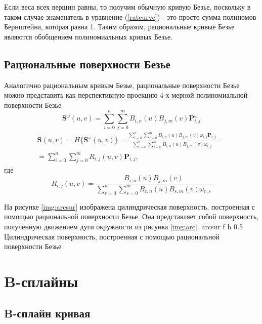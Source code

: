 \documentclass{bmstu}
\begin{document}
Если веса всех вершин равны, то получим обычную кривую Безье, поскольку в таком случае знаменатель в уравнение (\ref{ratcurve}) - это просто сумма полиномов Бернштейна, которая равна 1. Таким образом, рациональные кривые Безье являются обобщением полиномиальных кривых Безье.
\subsection{Рациональные поверхности Безье}

Аналогично рациональным кривым Безье, рациональные поверхности Безье можно представить как перспективную проекцию 4-х мерной полиномиальной поверхности Безье
\[
    \mathbf{S}^\omega(u, v) = \sum\limits_{i=0}^n\sum\limits_{j=0}^mB_{i,n}(u)B_{j,m}(v)\mathbf{P}^\omega_{i,j}
\]
\begin{multline}
    \mathbf{S}(u,v) = H\{\mathbf{S}^\omega(u, v)\} =  \frac{\sum\limits_{i=0}^n\sum\limits_{j=0}^mB_{i,n}(u)B_{j,m}(v)\omega_{i, j}\mathbf{P}_{i,j}}{\sum\limits_{i=0}^n\sum\limits_{j=0}^mB_{i,n}(u)B_{j,m}(v)\omega_{i, j}} =\\= \sum\limits_{i=0}^n\sum\limits_{j=0}^mR_{i,j}(u,v)\mathbf{P}_{i,j},
\end{multline}
где
\begin{equation}
    R_{i,j}(u, v) = \frac{B_{i, n}(u)B_{j, m}(v)}{\sum\limits_{r=0}^n\sum\limits_{s=0}^mB_{r,n}(u)B_{s,m}(v)\omega_{r, s}}
\end{equation}

На рисунке \ref{img:arcsur} изображена цилиндрическая поверхность, построенная с помощью рациональной поверхности Безье. Она представляет собой поверхность, полученную движением дуги окружности из рисунка \ref{img:arc}.
{arcsur} %
{f} %
{h} %
{0.5\textwidth} %
{Цилиндрическая поверхность, построенная с помощью рациональной поверхности Безье} %

\section{B-сплайны}

\subsection{B-сплайн кривая}
\end{document}
